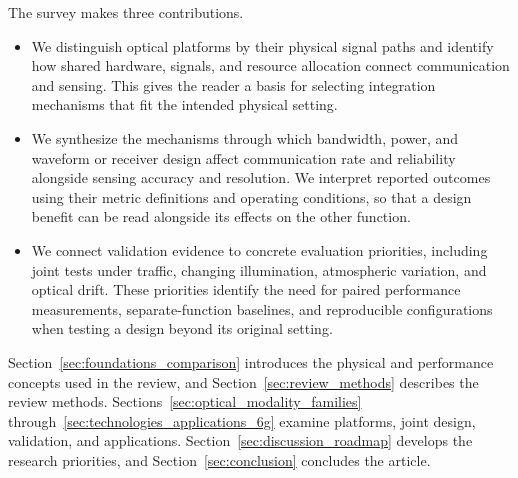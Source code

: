 The survey makes three contributions.
\begin{itemize}
\item We distinguish optical platforms by their physical signal paths and
identify how shared hardware, signals, and resource allocation connect
communication and sensing. This gives the reader a basis for selecting
integration mechanisms that fit the intended physical setting.

\item We synthesize the mechanisms through which bandwidth, power, and
waveform or receiver design affect communication rate and reliability
alongside sensing accuracy and resolution. We interpret reported outcomes
using their metric definitions and operating conditions, so that a design
benefit can be read alongside its effects on the other function.

\item We connect validation evidence to concrete evaluation priorities,
including joint tests under traffic, changing illumination, atmospheric
variation, and optical drift. These priorities identify the need for paired
performance measurements, separate-function baselines, and reproducible
configurations when testing a design beyond its original setting.
\end{itemize}

Section~\ref{sec:foundations_comparison} introduces the physical and performance
concepts used in the review, and Section~\ref{sec:review_methods} describes the
review methods. Sections~\ref{sec:optical_modality_families}
through~\ref{sec:technologies_applications_6g} examine platforms, joint design,
validation, and applications. Section~\ref{sec:discussion_roadmap} develops the
research priorities, and Section~\ref{sec:conclusion} concludes the article.

\FloatBarrier
